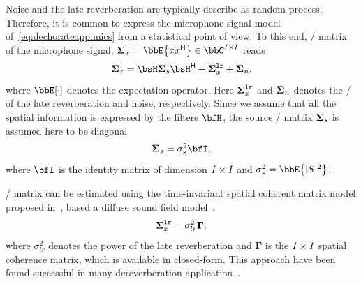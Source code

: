 \mynewline
Noise and the late reverberation are typically describe as random process.
Therefore, it is common to express the microphone signal model of~\cref{eq:dechorateapp:mics} from a statistical point of view.
To this end, \xPSD/ matrix of the microphone signal, $\xpsd_{\mic} = \bbE\kbrace{\mic \khermitian{\mic}} \in \bbC^{\numMics \times \numMics}$ reads
\begin{equation}
    \xpsd_{\mic} = \FLTS \xpsd_{\src} \khermitian{\FLTS} + \xpsd^{\mathtt{lr}}_{\mic} + \xpsd_{\nse}
    ,
\end{equation}
where $\bbE[\cdot]$ denotes the expectation operator.
Here $\boldsymbol{\Sigma}^{\mathtt{lr}}_{x}$ and $\boldsymbol{\Sigma}_{n}$ denotes the \xPSD/ of the late reverberation and noise, respectively.
Since we assume that all the spatial information is expressed by the filters $\FLTSS$, the source \xPSD/ matrix $\boldsymbol{\Sigma}_{s}$ is assumed here to be diagonal
\begin{equation}
    \xpsd_\src = \sigma_\src^2 \bfI
    ,
\end{equation}
where $\bfI$ is the identity matrix of dimension $I \times I$ and $\sigma_\src^2 = \bbE\kbrace{\powerOf{\SRC}}$.

 \xPSD/ matrix can be estimated using the time-invariant spatial coherent matrix model proposed in~, based a diffuse sound field model~.
\begin{equation}\label{eq:dechorateapp:gamma}
    \boldsymbol{\Sigma}^{\mathtt{lr}}_{x} = \sigma_{lr}^2\mathbf{\Gamma}
    ,
\end{equation}
where $\sigma_{lr}^2$ denotes the power of the late reverberation and $\mathbf{\Gamma}$ is the $I \times I$ spatial coherence matrix, which is available in closed-form.
This approach have been found successful in many dereverberation application~.

